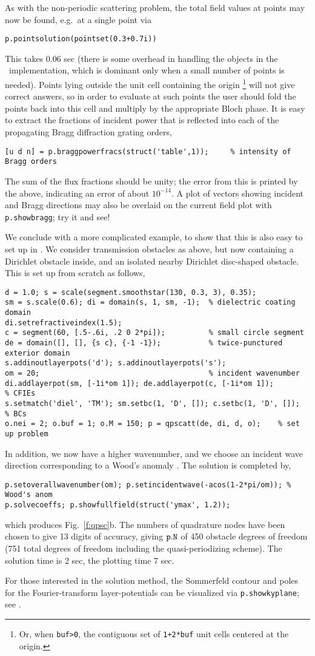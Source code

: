 As with the non-periodic scattering problem, the total field values at points
may now be found, e.g.\ at a single point via
\begin{verbatim}
p.pointsolution(pointset(0.3+0.7i))
\end{verbatim}
This takes 0.06 sec (there is some overhead in handling the
objects in the \matlab\ implementation, which is dominant only when
a small number of points is needed).
Points lying outside the unit cell containing the origin%
  \footnote{Or, when {\tt buf>0}, the contiguous set of
{\tt 1+2*buf} unit cells centered at the origin.}
will not give
correct answers, so in order to evaluate at such points
the user should fold the points back into this cell
and multiply by the appropriate Bloch phase.
It is easy to extract the fractions of incident power that is reflected
into each of the propagating Bragg diffraction grating orders,
\begin{verbatim}
[u d n] = p.braggpowerfracs(struct('table',1));     % intensity of Bragg orders
\end{verbatim}
The sum of the flux fractions should be unity; the error from this is
printed by the above, indicating an error of about $10^{-14}$.
A plot of vectors showing incident and Bragg directions
may also be overlaid on the current field plot with
{\tt p.showbragg}; try it and see!

We conclude with a more complicated example, to show that this is also
easy to set up in \mpspack.
We consider transmission obstacles as above, but now containing a Dirichlet
obstacle inside, and an isolated nearby Dirichlet disc-shaped obstacle.
This is set up from scratch as follows,
\begin{verbatim}
d = 1.0; s = scale(segment.smoothstar(130, 0.3, 3), 0.35);
sm = s.scale(0.6); di = domain(s, 1, sm, -1);  % dielectric coating domain
di.setrefractiveindex(1.5);
c = segment(60, [.5-.6i, .2 0 2*pi]);          % small circle segment
de = domain([], [], {s c}, {-1 -1});           % twice-punctured exterior domain
s.addinoutlayerpots('d'); s.addinoutlayerpots('s');
om = 20;                                       % incident wavenumber
di.addlayerpot(sm, [-1i*om 1]); de.addlayerpot(c, [-1i*om 1]);         % CFIEs
s.setmatch('diel', 'TM'); sm.setbc(1, 'D', []); c.setbc(1, 'D', []);   % BCs
o.nei = 2; o.buf = 1; o.M = 150; p = qpscatt(de, di, d, o);    % set up problem
\end{verbatim}
In addition, we now have a higher wavenumber, and
we choose an incident wave direction corresponding to
a Wood's anomaly \cite{linton07}. The solution is completed by,
\begin{verbatim}
p.setoverallwavenumber(om); p.setincidentwave(-acos(1-2*pi/om)); % Wood's anom
p.solvecoeffs; p.showfullfield(struct('ymax', 1.2));
\end{verbatim}
which produces Fig.~\ref{f:qpsc}b.
The numbers of quadrature nodes have been chosen to give 13 digits of
accuracy, giving ${\tt p.N}$ of 450 obstacle degrees of freedom
(751 total degrees of freedom including the quasi-periodizing scheme).
The solution time is 2 sec, the plotting time 7 sec.

For those interested in the solution method,
the Sommerfeld contour and poles for the Fourier-transform layer-potentials
can be visualized via {\tt p.showkyplane}; see \cite{qpsc}.

